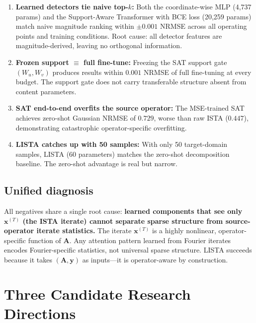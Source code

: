 \documentclass[11pt]{article}
\newcommand{\A}{\mathbf{A}}
\newcommand{\x}{\mathbf{x}}
\newcommand{\y}{\mathbf{y}}
\begin{document}
\begin{enumerate}[leftmargin=2em]
    \item \textbf{Learned detectors tie naive top-$k$:}
    Both the coordinate-wise MLP (4,737 params) and the
    Support-Aware Transformer with BCE loss (20,259 params)
    match naive magnitude ranking within $\pm 0.001$ NRMSE
    across all operating points and training conditions.
    Root cause: all detector features are magnitude-derived,
    leaving no orthogonal information.

    \item \textbf{Frozen support $\equiv$ full fine-tune:}
    Freezing the SAT support gate $(W_u, W_v)$ produces
    results within $0.001$ NRMSE of full fine-tuning at every
    budget. The support gate does not carry transferable structure
    absent from content parameters.

    \item \textbf{SAT end-to-end overfits the source operator:}
    The MSE-trained SAT achieves zero-shot Gaussian NRMSE of $0.729$,
    worse than raw ISTA ($0.447$), demonstrating catastrophic
    operator-specific overfitting.

    \item \textbf{LISTA catches up with 50 samples:}
    With only 50 target-domain samples, LISTA (60 parameters) matches
    the zero-shot decomposition baseline. The zero-shot advantage
    is real but narrow.
\end{enumerate}

\subsection{Unified diagnosis}

All negatives share a single root cause: \textbf{learned components
that see only $\x^{(T)}$ (the ISTA iterate) cannot separate sparse
structure from source-operator iterate statistics.}
The iterate $\x^{(T)}$ is a highly nonlinear, operator-specific
function of $\A$.
Any attention pattern learned from Fourier iterates encodes
Fourier-specific statistics, not universal sparse structure.
LISTA succeeds because it takes $(\A, \y)$ as inputs---it is
operator-aware by construction.

\section{Three Candidate Research Directions}
\label{sec:options}
\end{document}
